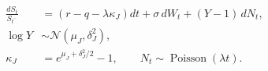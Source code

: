 \documentclass{equation-sheet}
\begin{document}
\begin{equation*}
\begin{aligned}
\frac{dS_t}{S_{t^-}}
  &= (r-q-\lambda\kappa_J)dt + \sigma\,dW_t
     + (Y-1)\,dN_t, \\
\log Y &\sim \mathcal N(\mu_J,\delta_J^2), \\
\kappa_J &= e^{\mu_J+\delta_J^2/2}-1,
\qquad N_t\sim\operatorname{Poisson}(\lambda t).
\end{aligned}
\end{equation*}
\end{document}

